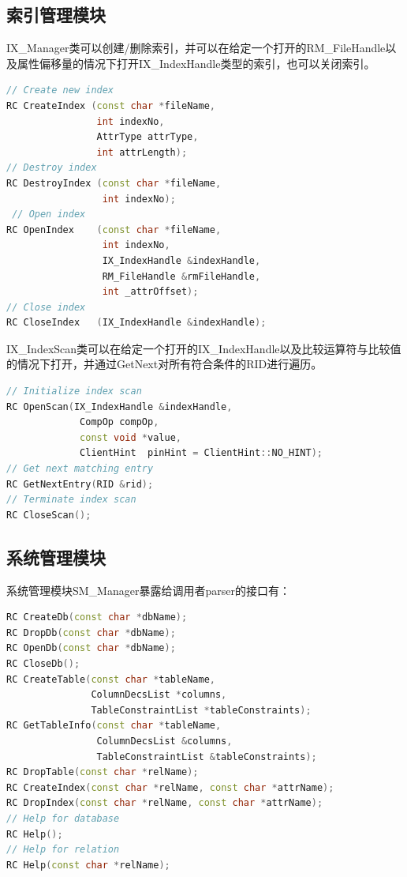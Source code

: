 \documentclass[11pt,UTF8]{report}
\begin{document}
\subsection{索引管理模块}
IX\_Manager类可以创建/删除索引，并可以在给定一个打开的RM\_FileHandle以及属性偏移量的情况下打开IX\_IndexHandle类型的索引，也可以关闭索引。
\begin{lstlisting}[language=C++]
// Create new index
RC CreateIndex (const char *fileName,          
                int indexNo,
                AttrType attrType,
                int attrLength);
// Destroy index
RC DestroyIndex (const char *fileName,          
                 int indexNo);
 // Open index
RC OpenIndex    (const char *fileName,         
                 int indexNo,
                 IX_IndexHandle &indexHandle,
                 RM_FileHandle &rmFileHandle,
                 int _attrOffset);
// Close index
RC CloseIndex   (IX_IndexHandle &indexHandle);  
\end{lstlisting}
IX\_IndexScan类可以在给定一个打开的IX\_IndexHandle以及比较运算符与比较值的情况下打开，并通过GetNext对所有符合条件的RID进行遍历。                           
\begin{lstlisting}[language=C++]
// Initialize index scan
RC OpenScan(IX_IndexHandle &indexHandle, 
             CompOp compOp,
             const void *value,
             ClientHint  pinHint = ClientHint::NO_HINT);
// Get next matching entry
RC GetNextEntry(RID &rid); 
// Terminate index scan                       
RC CloseScan();     	
\end{lstlisting}
\subsection{系统管理模块}
系统管理模块SM\_Manager暴露给调用者parser的接口有：
\begin{lstlisting}[language=C++]
RC CreateDb(const char *dbName);             
RC DropDb(const char *dbName);             
RC OpenDb(const char *dbName);            
RC CloseDb();                                  
RC CreateTable(const char *tableName,
               ColumnDecsList *columns,
               TableConstraintList *tableConstraints);
RC GetTableInfo(const char *tableName,
                ColumnDecsList &columns,
                TableConstraintList &tableConstraints);				
RC DropTable(const char *relName);               
RC CreateIndex(const char *relName, const char *attrName);
RC DropIndex(const char *relName, const char *attrName);
// Help for database
RC Help();        
// Help for relation                          
RC Help(const char *relName);               	
\end{lstlisting}
\end{document}
